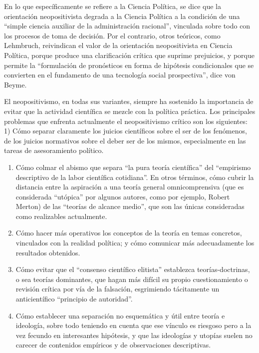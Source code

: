 \documentclass[
]{book}
\begin{document}
En lo que específicamente se refiere a la Ciencia Política, se dice que la orientación neopositivista degrada a la Ciencia Política a la condición de una ``simple ciencia auxiliar de la administración racional'', vinculada sobre todo con los procesos de toma de decisión. Por el contrario, otros teóricos, como Lehmbruch, reivindican el valor de la orientación neopositivista en Ciencia Política, porque produce una clarificación crítica que suprime prejuicios, y porque permite la ``formulación de pronósticos en forma de hipótesis condicionales que se convierten en el fundamento de una tecnología social prospectiva'', dice von Beyme.

El neopositivismo, en todas sus variantes, siempre ha sostenido la importancia de evitar que la actividad científica se mezcle con la política práctica. Los principales problemas que enfrenta actualmente el neopositivismo crítico son los siguientes: 1) Cómo separar claramente los juicios científicos sobre el ser de los fenómenos, de los juicios normativos sobre el deber ser de los mismos, especialmente en las tareas de asesoramiento político.

\begin{enumerate}
\def\labelenumi{\arabic{enumi})}
\setcounter{enumi}{1}
\item
  Cómo colmar el abismo que separa ``la pura teoría científica'' del ``empirismo descriptivo de la labor científica cotidiana''. En otros términos, cómo cubrir la distancia entre la aspiración a una teoría general omnicomprensiva (que es considerada ``utópica'' por algunos autores, como por ejemplo, Robert Merton) de las ``teorías de alcance medio'', que son las únicas consideradas como realizables actualmente.
\item
  Cómo hacer más operativos los conceptos de la teoría en temas concretos, vinculados con la realidad política; y cómo comunicar más adecuadamente los resultados obtenidos.
\item
  Cómo evitar que el ``consenso científico elitista'' establezca teorías-doctrinas, o sea teorías dominantes, que hagan más difícil su propio cuestionamiento o revisión crítica por vía de la falsación, esgrimiendo tácitamente un anticientífico ``principio de autoridad''.
\item
  Cómo establecer una separación no esquemática y útil entre teoría e ideología, sobre todo teniendo en cuenta que ese vínculo es riesgoso pero a la vez fecundo en interesantes hipótesis, y que las ideologías y utopías suelen no carecer de contenidos empíricos y de observaciones descriptivas.
\end{enumerate}
\end{document}
